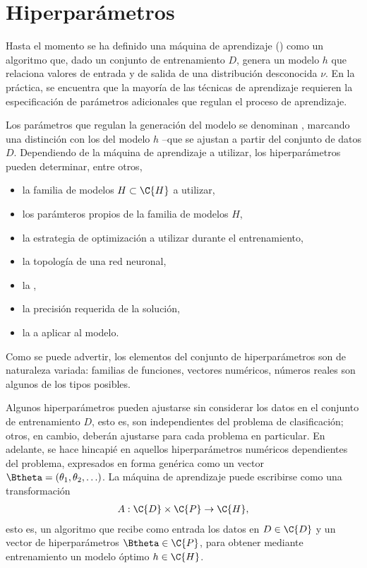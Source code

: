 %
%
%
\section{Hiperparámetros}
%
Hasta el momento se ha definido una máquina de aprendizaje
() como un algoritmo que, dado un conjunto
de entrenamiento $D$, genera un modelo $h$ que relaciona valores de
entrada y de salida de una distribución desconocida $\nu$. En la
práctica, se encuentra que la mayoría de las técnicas de aprendizaje
requieren la especificación de parámetros adicionales que regulan el
proceso de aprendizaje.

Los parámetros que regulan la generación del modelo se denominan
, marcando una distinción con los 
del modelo $h$ --que se ajustan a partir del conjunto de datos
$D$. Dependiendo de la máquina de aprendizaje a utilizar, los
hiperparámetros pueden determinar, entre otros,
%
\begin{itemize}
\item la familia de modelos $H\subset\C{H}$ a utilizar,
\item los parámteros propios de la familia de modelos $H$,
\item la estrategia de optimización a utilizar durante el
  entrenamiento,
\item la topología de una red neuronal,
\item la ,
\item la precisión requerida de la solución,
\item la  a aplicar al modelo.
\end{itemize}
%
Como se puede advertir, los elementos del conjunto de hiperparámetros
son de naturaleza variada: familias de funciones, vectores numéricos,
números reales son algunos de los tipos posibles.

Algunos hiperparámetros pueden ajustarse sin considerar los datos en
el conjunto de entrenamiento $D$, esto es, son independientes del
problema de clasificación; otros, en cambio, deberán ajustarse para
cada problema en particular. En adelante, se hace hincapié en aquellos
hiperparámetros numéricos dependientes del problema, expresados en
forma genérica como un vector
$\Btheta=(\theta_1,\theta_2,\ldots)$. La máquina de
aprendizaje puede escribirse como una transformación
%
\begin{align}
  A:\C{D}\times\C{P}\rightarrow\C{H},
\end{align}
%
esto es, un algoritmo que recibe como entrada los datos en $D\in\C{D}$
y un vector de hiperparámetros $\Btheta\in\C{P}$, para obtener
mediante entrenamiento un modelo óptimo $h\in\C{H}$.
